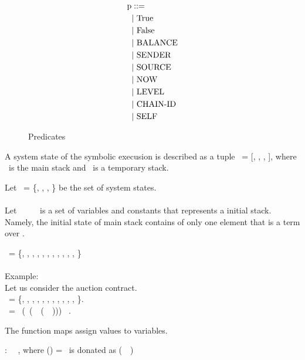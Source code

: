 \documentclass[runningheads]{llncs}
\begin{document}
\begin{figure}
\begin{align*}
\text{p} &::= \\
   &\text{$\mid$}\ \text{True} \\
   &\text{$\mid$}\ \text{False} \\
   &\text{$\mid$}\ \text{BALANCE} \\
   &\text{$\mid$}\ \text{SENDER} \\
   &\text{$\mid$}\ \text{SOURCE} \\
   &\text{$\mid$}\ \text{NOW} \\
   &\text{$\mid$}\ \text{LEVEL} \\
   &\text{$\mid$}\ \text{CHAIN-ID} \\
   &\text{$\mid$}\ \text{SELF}
\end{align*}
\caption{Predicates}
\label{fig:predicates}
\end{figure}

\begin{definition}
A system state of the symbolic execusion is described as a tuple \STATE\ = [\INSTRUCTION, \STACK, \TSTACK, \PREDICATE], where \STACK\ is the main stack and \TSTACK\ is a temporary stack.
\end{definition}

Let \SYSTEM\ = \{\STATEONE, \STATETWO, \DOT, \STATEN \} be the set of system states.
\\
\\
Let \SETA\ \Subseteq\ \VARIABLE\ \CUP\ \CONSTANT\ is a set of variables and constants that represents a initial stack. Namely, the initial state of main stack contains of only one element that is a term over \SETA.

\SETA\ = \{\VariableOne, \VariableTwo, \DOT, \VariableN, \BALANCE, \AMOUNT, \SENDER, \SOURCE, \NOW, \LEVEL, \CHAINID, \SELF\}
\\ 
\\
Example:
\\
Let us consider the auction contract.
\\
\SETAAUCTION\ = \{\AuctionBid, \AuctionOwner, \AuctionOpen, \AuctionBidder, \BALANCE, \AMOUNT, \SENDER, \SOURCE, \NOW, \LEVEL, \CHAINID, \SELF\}.
\\
\SINIT\ = \PAIR\ (\AuctionBidder\ (\PAIR\ \AuctionOpen\ (\PAIR\ \AuctionOwner\ \AuctionBidder))) \STACKCONCAT\ \EMPTYSTACK.

\begin{definition}
The function maps assign values to variables. 

\FMAP : \SETA\  \Mapsto\ \TERM, 
where \MAP(\VariableX) = \Term\ is donated as (\VariableX\ \Mapsto\ \Term)
\end{definition}
\end{document}
